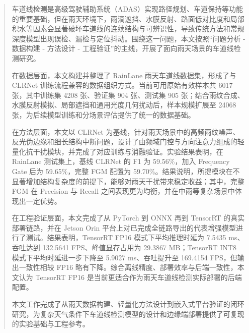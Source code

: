 

\begin{abstract}
车道线检测是高级驾驶辅助系统（ADAS）实现路径规划、车道保持等功能的重要基础，但在雨天环境下，雨滴遮挡、水膜反射、路面低对比度和局部积水等因素会显著破坏车道线的连续结构与可辨识性，导致传统方法和常规深度模型出现误检、漏检与定位抖动。围绕这一问题，本文按照“问题分析 - 数据构建 - 方法设计 - 工程验证”的主线，开展了面向雨天场景的车道线检测研究。

在数据层面，本文构建并整理了 RainLane 雨天车道线数据集，形成了与 CLRNet 训练流程兼容的数据组织方式。当前可用原始有效样本共 6017 张，其中训练集 4208 张、验证集 904 张、测试集 905 张；结合雨纹合成、水膜反射模拟、局部遮挡和通用光度几何扰动后，样本规模扩展至 24068 张，为后续模型训练和分场景评估提供了统一的数据基础。

在方法层面，本文以 CLRNet 为基线，针对雨天场景中的高频雨纹噪声、反光伪边缘和细长结构中断问题，设计了由频域门控与方向注意力组成的轻量化抗干扰模块，并完成了对应训练与消融验证。实验结果表明，在 RainLane 测试集上，基线 CLRNet 的 F1 为 59.56\%，加入 Frequency Gate 后为 59.65\%，完整 FGM 配置为 59.70\%。结果说明，所提模块在不显著增加结构复杂度的前提下，能够对雨天干扰带来稳定收益；其中，完整 FGM 在 Precision 与 Recall 之间表现更为均衡，并在中雨等复杂场景中体现出一定优势。

在工程验证层面，本文完成了从 PyTorch 到 ONNX 再到 TensorRT 的真实部署链路，并在 Jetson Orin 平台上对已完成全链路导出的代表增强模型进行了测试。结果表明，TensorRT FP16 模式下平均推理时延为 7.5435 ms、吞吐达到 132.5641 FPS、峰值显存占用为 29.3867 MB；TensorRT INT8 模式下平均时延进一步下降至 5.9027 ms、吞吐提升至 169.4154 FPS，但输出一致性相较 FP16 略有下降。综合离线精度、部署效率与后端一致性，本文认为 TensorRT FP16 是当前更适合作为雨天车道线检测实际部署的后端配置。

本文工作完成了从雨天数据构建、轻量化方法设计到嵌入式平台验证的闭环研究，为复杂天气条件下车道线检测模型的设计和边缘端部署提供了可复现的实验基础与工程参考。
\end{abstract}

